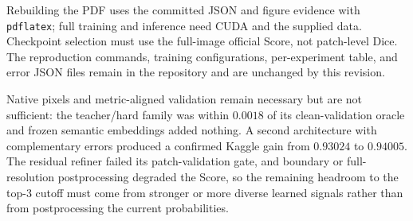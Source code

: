 \documentclass[10pt]{article}
\begin{document}
Rebuilding the PDF uses the committed JSON and figure evidence with \texttt{pdflatex}; full training and inference need CUDA and the supplied data. Checkpoint selection must use the full-image official Score, not patch-level Dice. The reproduction commands, training configurations, per-experiment table, and error JSON files remain in the repository and are unchanged by this revision.

Native pixels and metric-aligned validation remain necessary but are not sufficient: the teacher/hard family was within $0.0018$ of its clean-validation oracle and frozen semantic embeddings added nothing. A second architecture with complementary errors produced a confirmed Kaggle gain from $0.93024$ to $0.94005$. The residual refiner failed its patch-validation gate, and boundary or full-resolution postprocessing degraded the Score, so the remaining headroom to the top-3 cutoff must come from stronger or more diverse learned signals rather than from postprocessing the current probabilities.
\end{document}
